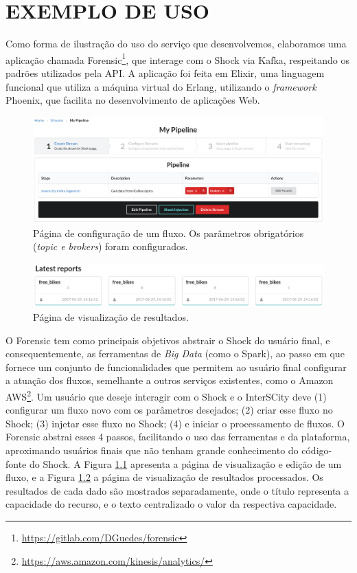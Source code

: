 \chapter[EXEMPLO DE USO]{EXEMPLO DE USO}
\label{chapter:example}

Como forma de ilustração do uso do serviço que desenvolvemos, elaboramos uma
aplicação chamada
Forensic\footnote{\url{https://gitlab.com/DGuedes/forensic}}, que interage
com o Shock via Kafka, respeitando os padrões utilizados pela API. A aplicação
foi feita em Elixir, uma linguagem funcional que utiliza a máquina virtual do
Erlang, utilizando o \textit{framework} Phoenix, que facilita no desenvolvimento
de aplicações Web.

\begin{figure}[hbt]
  \centering
  \includegraphics[width=\textwidth]{figuras/pipeline.png}
    \caption{Página de configuração de um fluxo. Os parâmetros
obrigatórios (\textit{topic e brokers}) foram configurados.}
  \label{fig:forensicparams}
\end{figure}

\begin{figure}[hbt]
  \centering
  \includegraphics[width=\textwidth]{figuras/latest-reports.png}
    \caption{Página de visualização de resultados.}
  \label{fig:reports}
\end{figure}

O Forensic tem como principais objetivos abstrair o Shock do usuário final,
e consequentemente, as ferramentas de \textit{Big Data} (como o Spark), ao passo em que
fornece um conjunto de funcionalidades que permitem ao usuário final configurar
a atuação dos fluxos, semelhante a outros serviços existentes,
como o Amazon AWS\footnote{\url{https://aws.amazon.com/kinesis/analytics/}}.
Um usuário que deseje interagir com o Shock e o InterSCity deve
(1) configurar um fluxo novo com os
parâmetros desejados; (2) criar esse fluxo no Shock; (3) injetar
esse fluxo no Shock; (4) e iniciar o processamento de fluxos.
O Forensic abstrai esses 4 passos, facilitando o uso
das ferramentas e da plataforma, aproximando usuários finais que não tenham
grande conhecimento do código-fonte do Shock. A Figura \ref{fig:forensicparams}
apresenta a página de visualização e edição de um fluxo, e a Figura
\ref{fig:reports} a página de visualização de resultados processados. Os
resultados de cada dado são mostrados separadamente, onde o título representa
a capacidade do recurso, e o texto centralizado o valor da respectiva capacidade.

